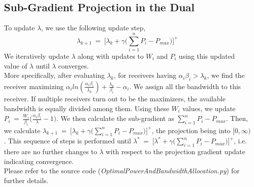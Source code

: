 \documentclass[12pt, draftcls, onecolumn]{IEEEtran}
\begin{document}
\subsection{Sub-Gradient Projection in the Dual}
To update $\lambda$, we use the following update step,
\[\lambda_{k+1}\ =\ \Big[\lambda_k + \gamma \Big(\sum_{i=1}^n P_i - P_{max}\Big)\Big]^+\]
We iteratively update $\lambda$ along with updates to $W_i$ and $P_i$ using this updated value of $\lambda$ until $\lambda$ converges.
\\More specifically, after evaluating $\lambda_k$, for receivers having $\alpha_i \beta_i > \lambda_k$, we find the receiver maximizing $\alpha_i ln(\frac{\alpha_i \beta_i}{\lambda_k}) + \frac{\lambda_k}{\beta_i} - \alpha_i$. We assign all the bandwidth to this receiver. If multiple receivers turn out to be the maximizers, the available bandwidth is equally divided among them. Using these $W_i$ values, we update $P_i\ =\ \frac{W_i}{\beta_i}\Big(\frac{\alpha_i \beta_i}{\lambda} - 1\Big)$. We then calculate the sub-gradient as $\sum_{i=1}^n P_i - P_{max}$. Then, we calculate $\lambda_{k+1}\ =\ \Big[\lambda_k + \gamma \Big(\sum_{i=1}^n P_i - P_{max}\Big)\Big]^+$, the projection being into $[0, \infty)$. This sequence of steps is performed until $\lambda^{*}\ =\ \Big[\lambda^{*} + \gamma \Big(\sum_{i=1}^n P_i - P_{max}\Big)\Big]^+$, i.e. there are no further changes to $\lambda$ with respect to the projection gradient update indicating convergence.
\\Please refer to the source code (\textit{OptimalPowerAndBandwidthAllocation.py}) for further details.
\end{document}
